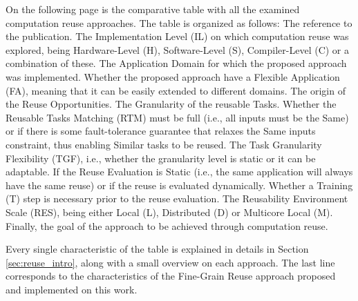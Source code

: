 \label{sec:anex_tab}

On the following page is the comparative table with all the examined computation reuse approaches. The table is organized as follows: The reference to the publication. The Implementation Level (IL) on which computation reuse was explored, being Hardware-Level (H), Software-Level (S), Compiler-Level (C) or a combination of these. The Application Domain for which the proposed approach was implemented. Whether the proposed approach have a Flexible Application (FA), meaning that it can be easily extended to different domains. The origin of the Reuse Opportunities. The Granularity of the reusable Tasks. Whether the Reusable Tasks Matching (RTM) must be full (i.e., all inputs must be the Same) or if there is some fault-tolerance guarantee that relaxes the Same inputs constraint, thus enabling Similar tasks to be reused. The Task Granularity Flexibility (TGF), i.e., whether the granularity level is static or it can be adaptable. If the Reuse Evaluation is Static (i.e., the same application will always have the same reuse) or if the reuse is evaluated dynamically. Whether a Training (T) step is necessary prior to the reuse evaluation. The Reusability Environment Scale (RES), being either Local (L), Distributed (D) or Multicore Local (M). Finally, the goal of the approach to be achieved through computation reuse.

Every single characteristic of the table is explained in details in Section \ref{sec:reuse_intro}, along with a small overview on each approach. The last line corresponds to the characteristics of the Fine-Grain Reuse approach proposed and implemented on this work.

\newpage


